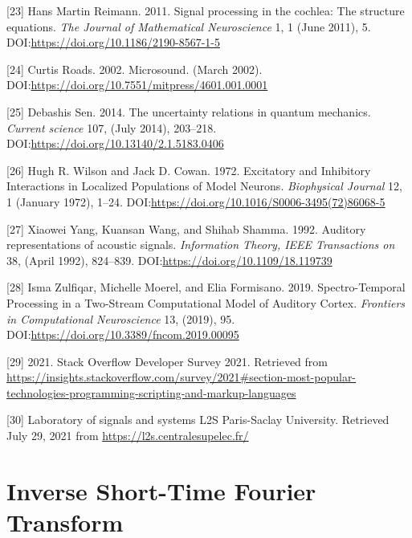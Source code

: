 \documentclass[american,]{article}
\theoremstyle{definition}
\theoremstyle{definition}
\theoremstyle{definition}
\theoremstyle{remark}
\begin{document}
\leavevmode\hypertarget{ref-reimann2011}{}%
{[}23{]} Hans Martin Reimann. 2011. Signal processing in the cochlea: The structure equations. \emph{The Journal of Mathematical Neuroscience} 1, 1 (June 2011), 5. DOI:\url{https://doi.org/10.1186/2190-8567-1-5}

\leavevmode\hypertarget{ref-roads2002}{}%
{[}24{]} Curtis Roads. 2002. Microsound. (March 2002). DOI:\url{https://doi.org/10.7551/mitpress/4601.001.0001}

\leavevmode\hypertarget{ref-sen2014}{}%
{[}25{]} Debashis Sen. 2014. The uncertainty relations in quantum mechanics. \emph{Current science} 107, (July 2014), 203--218. DOI:\url{https://doi.org/10.13140/2.1.5183.0406}

\leavevmode\hypertarget{ref-wilson1972}{}%
{[}26{]} Hugh R. Wilson and Jack D. Cowan. 1972. Excitatory and Inhibitory Interactions in Localized Populations of Model Neurons. \emph{Biophysical Journal} 12, 1 (January 1972), 1--24. DOI:\url{https://doi.org/10.1016/S0006-3495(72)86068-5}

\leavevmode\hypertarget{ref-yang1992}{}%
{[}27{]} Xiaowei Yang, Kuansan Wang, and Shihab Shamma. 1992. Auditory representations of acoustic signals. \emph{Information Theory, IEEE Transactions on} 38, (April 1992), 824--839. DOI:\url{https://doi.org/10.1109/18.119739}

\leavevmode\hypertarget{ref-zulfiqar2019}{}%
{[}28{]} Isma Zulfiqar, Michelle Moerel, and Elia Formisano. 2019. Spectro-Temporal Processing in a Two-Stream Computational Model of Auditory Cortex. \emph{Frontiers in Computational Neuroscience} 13, (2019), 95. DOI:\url{https://doi.org/10.3389/fncom.2019.00095}

\leavevmode\hypertarget{ref-so_survey2021}{}%
{[}29{]} 2021. Stack Overflow Developer Survey 2021. Retrieved from \url{https://insights.stackoverflow.com/survey/2021\#section-most-popular-technologies-programming-scripting-and-markup-languages}

\leavevmode\hypertarget{ref-l2s}{}%
{[}30{]} Laboratory of signals and systems L2S Paris-Saclay University. Retrieved July 29, 2021 from \url{https://l2s.centralesupelec.fr/}

\pagebreak

\hypertarget{appendix-appendix}{%
\appendix}


\hypertarget{istft}{%
\section{Inverse Short-Time Fourier Transform}\label{istft}}
\end{document}
